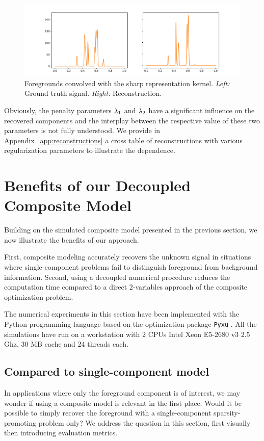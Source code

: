 \documentclass[12pt]{article}
\begin{document}
        \begin{figure}[t]
            \centering
            \includegraphics[width=\linewidth]{figures/simple_reco/recos_conv.pdf}        
            \caption{Foregrounds convolved with the sharp representation kernel. \textit{Left:} Ground truth signal. \textit{Right:} Reconstruction.}
            \label{fig:simple:recos-conv}
        \end{figure}

        Obviously, the penalty parameters $\lambda_{1}$ and $\lambda_{2}$ have a significant influence on the recovered components and the interplay between the respective value of these two parameters is not fully understood. We provide in Appendix~\ref{app:reconstructions} a cross table of reconstructions with various regularization parameters to illustrate the dependence. 
        
\section{Benefits of our Decoupled Composite Model}
    
    Building on the simulated composite model presented in the previous section, we now illustrate the benefits of our approach.
    
    First, composite modeling accurately recovers the unknown signal in situations where single-component problems fail to distinguish foreground from background information. Second, using a decoupled numerical procedure reduces the computation time compared to a direct 2-variables approach of the composite optimization problem.

    The numerical experiments in this section have been implemented with the Python programming language based on the optimization package \texttt{Pyxu} \cite{pyxu-framework}. All the simulations have run on a workstation with 2 CPUs Intel Xeon E5-2680 v3 \@2.5 Ghz, 30 MB cache and 24 threads each. 

    \subsection{Compared to single-component model}
    \label{sec:bene:comp}
        In applications where only the foreground component is of interest, we may wonder if using a composite model is relevant in the first place. Would it be possible to simply recover the foreground with a single-component sparsity-promoting problem only? We address the question in this section, first visually then introducing evaluation metrics.
\end{document}
